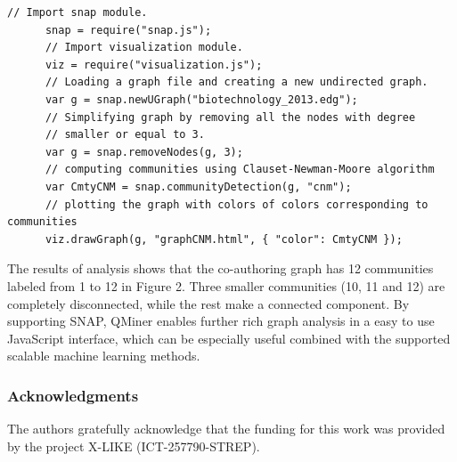 \documentclass{article} %
\begin{document}
      \begin{lstlisting}[caption=Graph analysis]
      // Import snap module.
      snap = require("snap.js");
      // Import visualization module.
      viz = require("visualization.js");
      // Loading a graph file and creating a new undirected graph.
      var g = snap.newUGraph("biotechnology_2013.edg");
      // Simplifying graph by removing all the nodes with degree
      // smaller or equal to 3.
      var g = snap.removeNodes(g, 3);
      // computing communities using Clauset-Newman-Moore algorithm
      var CmtyCNM = snap.communityDetection(g, "cnm");
      // plotting the graph with colors of colors corresponding to communities
      viz.drawGraph(g, "graphCNM.html", { "color": CmtyCNM });
      \end{lstlisting}
The results of analysis shows that the co-authoring graph has 12 communities labeled from 1 to 12 in Figure 2. Three smaller communities (10, 11 and 12) are completely disconnected, while the rest make a connected component. By supporting SNAP, QMiner enables further rich graph analysis in a easy to use JavaScript interface, which can be especially useful combined with the supported scalable machine learning methods.


\subsubsection*{Acknowledgments}
   The authors gratefully acknowledge that the funding for this work was provided by the project X-LIKE (ICT-257790-STREP)\cite{xlike}.




\end{document}
